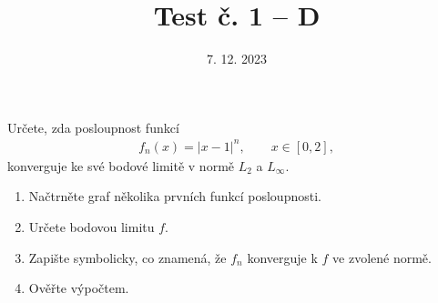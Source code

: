 \documentclass{article}
\begin{document}
\title{Test č. 1 -- D}
\date{7. 12. 2023}
\author{}
\maketitle


\noindent
Určete, zda posloupnost funkcí
\begin{align*}
        f_n(x) = |x-1|^{n}, \qquad x\in[0,2],
\end{align*}
konverguje ke své bodové limitě v normě $L_2$ a $L_\infty$.

\vspace{2cm}

\begin{enumerate}
\item Načtrněte graf několika prvních funkcí posloupnosti.
\item Určete bodovou limitu $f$.
\item Zapište symbolicky, co znamená, že $f_n$ konverguje k $f$ ve zvolené normě.
\item Ověřte výpočtem.
\end{enumerate}

\end{document}
